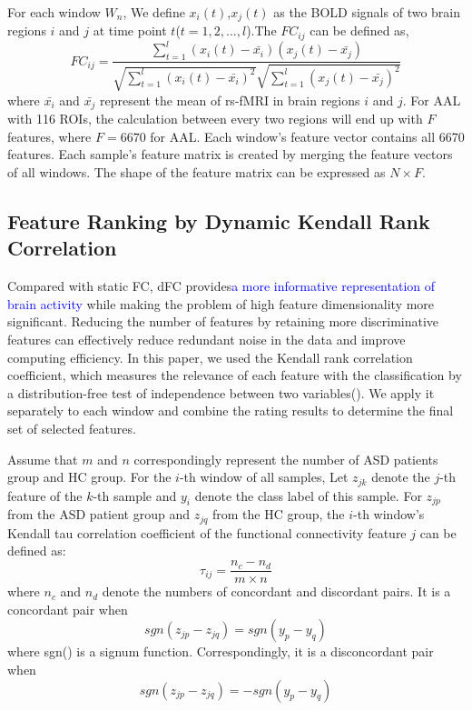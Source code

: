 \documentclass[a4paper]{cas-dc}
\begin{document}
For each window $W_n$, We define $x_{i}(t)$,$x_{j}(t)$ as the BOLD signals of two brain regions $i$ and $j$ at time point $t$($t = 1,2,...,l$).The $FC_{ij}$ can be defined as,
\begin{equation}
	FC_{ij}=\frac{\sum_{t=1}^{l}(x_{i}(t)-\bar{x_{i}})(x_{j}(t)-\bar{x_{j}})}{\sqrt{\sum_{t=1}^{l}(x_{i}(t)-\bar{x_{i}})^2}\sqrt{\sum_{t=1}^{l}(x_{j}(t)-\bar{x_{j}})^2}}
\end{equation}
where $\bar{x_{i}}$ and $\bar{x_{j}}$ represent the mean of rs-fMRI in brain regions $i$ and $j$. For AAL with 116 ROIs, the calculation between every two regions will end up with $F$ features, where $F=6670$ for AAL. Each window's feature vector contains all 6670 features. Each sample's feature matrix is created by merging the feature vectors of all windows. The shape of the feature matrix can be expressed as $N\times F$.
\subsection{Feature Ranking by Dynamic Kendall Rank Correlation}
Compared with static FC, dFC provides\textcolor{blue}{a more informative representation of brain activity} while making the problem of high feature dimensionality more significant. Reducing the number of features by retaining more discriminative features can effectively reduce redundant noise in the data and improve computing efficiency. In this paper, we used the Kendall rank correlation coefficient, which measures the relevance of each feature with the classification by a distribution-free test of independence between two variables(\cite{zeng2012identifying}). We apply it separately to each window and combine the rating results to determine the final set of selected features. 

Assume that $m$ and $n$ correspondingly represent the number of ASD patients group and HC group. For the $i$-th window of all samples, Let $z_{jk}$ denote the $j$-th feature of the $k$-th sample and $y_i$ denote the class label of this sample. For $z_{jp}$ from the ASD patient group and $z_{jq}$ from the HC group, the $i$-th window's Kendall tau correlation coefficient of the functional connectivity feature $j$ can be defined as:
\begin{equation}
	\tau_{ij} = \frac{n_c - n_d}{m \times n}
\end{equation}
where $n_c$ and $n_d$ denote the numbers of concordant and discordant pairs. It is a concordant pair when
\begin{equation}
	sgn(z_{jp} - z_{jq}) = sgn(y_p-y_q)
\end{equation}
where sgn() is a signum function. Correspondingly, it is a disconcordant pair when
\begin{equation}
	sgn(z_{jp} - z_{jq}) = -sgn(y_p-y_q)
\end{equation}
\end{document}
